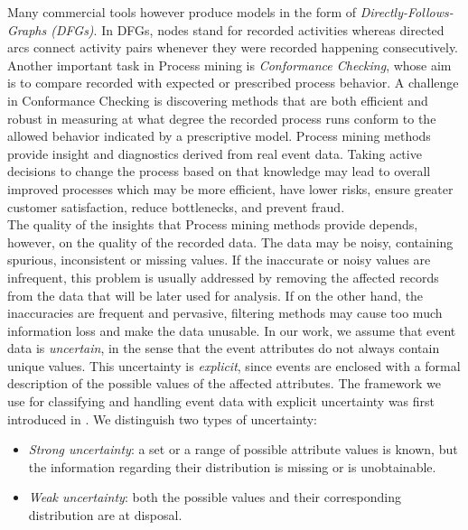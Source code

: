 Many commercial tools however produce models in the form of  \textit{Directly-Follows-Graphs (DFGs)}.
In DFGs, nodes stand for recorded activities whereas directed arcs connect activity pairs whenever they were recorded happening consecutively.
Another important task in Process mining is \textit{Conformance Checking}, whose aim is to compare recorded with expected or prescribed process behavior.
A challenge in Conformance Checking is discovering methods that are both efficient and robust in measuring at what degree the recorded process runs conform to the allowed behavior indicated by a prescriptive model.
Process mining methods provide insight and diagnostics derived from real event data.
Taking active decisions to change the process based on that knowledge may lead to overall improved processes which may be more efficient, have lower risks, ensure greater customer satisfaction, reduce bottlenecks, and prevent fraud.\\
The quality of the insights that Process mining methods provide depends, however, on the quality of the recorded data.
The data may be noisy, containing spurious, inconsistent or missing values.
If the inaccurate or noisy values are infrequent, this problem is usually addressed by removing the affected records from the data that will be later used for analysis.
If on the other hand, the inaccuracies are frequent and pervasive, filtering methods may cause too much information loss and make the data unusable.
In our work, we assume that event data is \textit{uncertain}, in the sense that the event attributes do not always contain unique values.
This uncertainty is \textit{explicit}, since events are enclosed with a formal description of the possible values of the affected attributes.
The framework we use for classifying and handling event data with explicit uncertainty was first introduced in \cite{mining}.
We distinguish two types of uncertainty:
\begin{itemize}
\item \textit{Strong uncertainty}: a set or a range of possible attribute values is known, but the information regarding their distribution is missing or is unobtainable. 
\item \textit{Weak uncertainty}: both the possible values and their corresponding distribution are at disposal.
\end{itemize}
%
%
%
%
%
